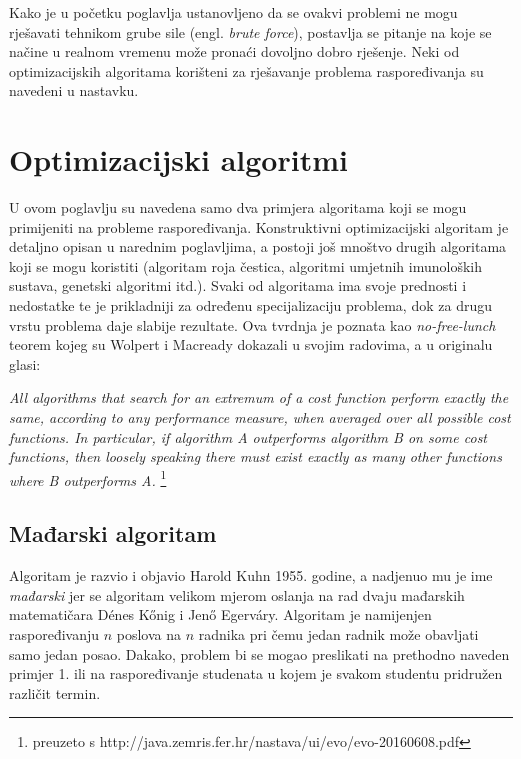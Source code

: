 \documentclass[times, utf8, zavrsni]{fer}
\begin{document}
Kako je u početku poglavlja ustanovljeno da se ovakvi problemi ne mogu rješavati tehnikom grube sile (engl. \textit{brute force}), postavlja
se pitanje na koje se načine u realnom vremenu može pronaći dovoljno dobro rješenje. Neki od optimizacijskih algoritama korišteni
za rješavanje problema raspoređivanja su navedeni u nastavku.

\section{Optimizacijski algoritmi}
U ovom poglavlju su navedena samo dva primjera algoritama koji se mogu primijeniti na probleme raspoređivanja. Konstruktivni optimizacijski
algoritam je detaljno opisan u narednim poglavljima, a postoji još mnoštvo drugih algoritama koji se mogu koristiti (algoritam roja
čestica, algoritmi umjetnih imunoloških sustava, genetski algoritmi itd.). Svaki od algoritama ima svoje prednosti i nedostatke te je
prikladniji za određenu specijalizaciju problema, dok za drugu vrstu problema daje slabije rezultate. Ova tvrdnja je poznata kao
\emph{no-free-lunch} teorem kojeg su Wolpert i Macready dokazali u svojim radovima, a u originalu glasi:

\begin{framed}
\emph{All algorithms that search for an extremum of a cost function perform exactly the same, according to any performance measure,
when averaged over all possible cost functions. In particular, if algorithm A outperforms algorithm B on some cost functions, then
loosely speaking there must exist exactly as many other functions where B outperforms A.}
\footnote{preuzeto s http://java.zemris.fer.hr/nastava/ui/evo/evo-20160608.pdf}
\end{framed}



\subsection{Mađarski algoritam}
Algoritam je razvio i objavio Harold Kuhn 1955. godine, a nadjenuo mu je ime \textit{mađarski} jer se algoritam velikom mjerom oslanja
na rad dvaju mađarskih matematičara Dénes Kőnig i Jenő Egerváry.
Algoritam je namijenjen raspoređivanju $n$ poslova na $n$ radnika pri čemu jedan radnik može obavljati samo jedan posao. Dakako,
problem bi se mogao preslikati na prethodno naveden primjer 1. ili na raspoređivanje studenata u kojem je svakom studentu pridružen
različit termin.
\end{document}
